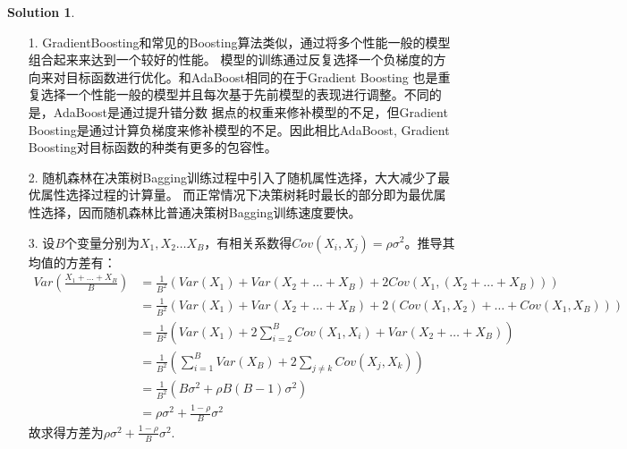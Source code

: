 \documentclass[a4paper,UTF8]{article}
\theoremstyle{definition}
\newtheorem*{solution}{Solution}
\begin{document}
\begin{solution}
	\begin{enumerate}
		\item [1.]
		      GradientBoosting和常见的Boosting算法类似，通过将多个性能一般的模型组合起来来达到一个较好的性能。
		      模型的训练通过反复选择一个负梯度的方向来对目标函数进行优化。和AdaBoost相同的在于Gradient Boosting
		      也是重复选择一个性能一般的模型并且每次基于先前模型的表现进行调整。不同的是，AdaBoost是通过提升错分数
		      据点的权重来修补模型的不足，但Gradient Boosting是通过计算负梯度来修补模型的不足。因此相比AdaBoost,
		      Gradient Boosting对目标函数的种类有更多的包容性。
		\item [2.]
		      随机森林在决策树Bagging训练过程中引入了随机属性选择，大大减少了最优属性选择过程的计算量。
		      而正常情况下决策树耗时最长的部分即为最优属性选择，因而随机森林比普通决策树Bagging训练速度要快。
		\item [3.]
		      设$B$个变量分别为$X_1,X_2\ldots X_B$，有相关系数得$Cov(X_i,X_j)=\rho\sigma^2$。推导其均值的方差有：
		      \begin{align*}
			      Var(\frac{X_1+\ldots+X_B}{B}) & = \frac{1}{B^2}(Var(X_1) +Var(X_2+\ldots+X_B)+2Cov(X_1,(X_2+\ldots+X_B)))          \\
			                                    & = \frac{1}{B^2}(Var(X_1) +Var(X_2+\ldots+X_B)+2(Cov(X_1,X_2)+\ldots+Cov(X_1,X_B))) \\
			                                    & = \frac{1}{B^2}(Var(X_1)+2\sum_{i=2}^B Cov(X_1,X_i)+Var(X_2+\ldots+X_B))           \\
			                                    & = \frac{1}{B^2}(\sum_{i=1}^B Var(X_B)+2\sum_{j\neq k}Cov(X_j,X_k))                 \\
			                                    & = \frac{1}{B^2}(B\sigma^2+\rho B(B-1)\sigma^2)                                     \\
			                                    & = \rho\sigma^2 +\frac{1-\rho}{B}\sigma^2
		      \end{align*}
		      故求得方差为$\rho\sigma^2 +\frac{1-\rho}{B}\sigma^2$.
	\end{enumerate}
\end{solution}



\end{document}
